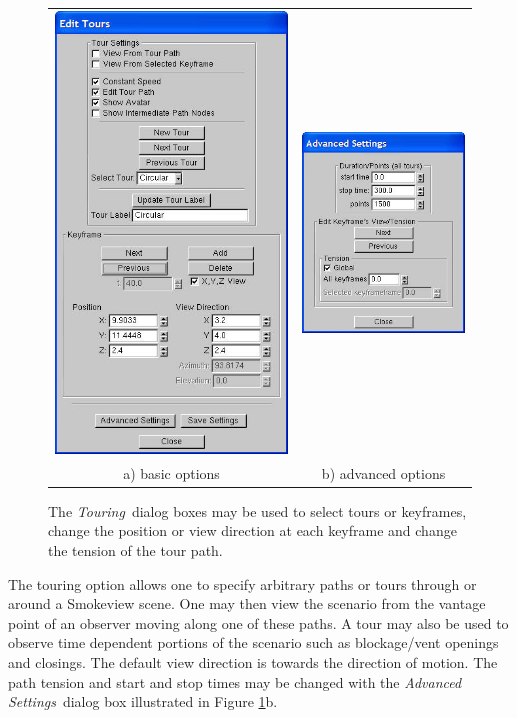 \documentclass[11pt,twoside]{book}
\begin{document}
\begin{figure}[\figoptions]
\begin{center}
\begin{tabular}{cc}
\includegraphics[width=2.472222in]{FIGURES/figTOUR}&
\includegraphics[width=1.722222in]{FIGURES/figADVANCEDTOUR}\\
a) basic options&b) advanced options\\
\end{tabular}
\end{center}
\caption[{\em Touring}\ dialog boxes.]{The {\em Touring}\ dialog
boxes may be used to select tours or keyframes, change the
position or view direction at each keyframe and change the tension
of the tour path. }
 \label{figTOUR}
\end{figure}

The touring option allows one to specify arbitrary paths or tours
through or around a Smokeview scene.  One may then view the
scenario from the vantage point of an observer moving along one of
these paths.    A tour may also be used to observe time dependent
portions of the scenario such as blockage/vent openings and
closings.  The default view direction is towards the direction of
motion.  The path tension and start and stop times may be changed
with the {\em Advanced Settings}\ dialog box illustrated in Figure
\ref{figTOUR}b.
\end{document}
